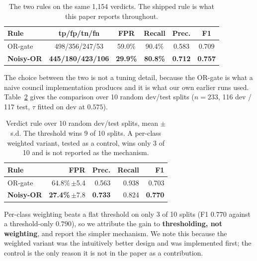 \documentclass[sigconf,nonacm]{acmart}
\begin{document}
\begin{table}[t]
\centering
\caption{The two rules on the same 1,154 verdicts. The shipped rule is what this
paper reports throughout.}
\label{tab:rule}
\small
\begin{tabular}{@{}lccccc@{}}
\toprule
\textbf{Rule} & \textbf{tp/fp/tn/fn} & \textbf{FPR} & \textbf{Recall} &
\textbf{Prec.} & \textbf{F1} \\
\midrule
OR-gate & 498/356/247/53 & 59.0\% & 90.4\% & 0.583 & 0.709 \\
\textbf{Noisy-OR} & \textbf{445/180/423/106} & \textbf{29.9\%} &
\textbf{80.8\%} & \textbf{0.712} & \textbf{0.757} \\
\bottomrule
\end{tabular}
\end{table}

The choice between the two is not a tuning detail, because the OR-gate is what a
naive council implementation produces and it is what our own earlier runs used.
Table~\ref{tab:splits} gives the comparison over 10 random dev/test splits
($n = 233$, 116 dev / 117 test, $\tau$ fitted on dev at $0.575$).

\begin{table}[t]
\centering
\caption{Verdict rule over 10 random dev/test splits, mean $\pm$ s.d. The
threshold wins 9 of 10 splits. A per-class weighted variant, tested as a control,
wins only 3 of 10 and is not reported as the mechanism.}
\label{tab:splits}
\small
\begin{tabular}{@{}lrrrr@{}}
\toprule
\textbf{Rule} & \textbf{FPR} & \textbf{Prec.} & \textbf{Recall} & \textbf{F1} \\
\midrule
OR-gate & 64.8\%\,$\pm$5.4 & 0.563 & 0.938 & 0.703 \\
\textbf{Noisy-OR} & \textbf{27.4\%}\,$\pm$7.8 & \textbf{0.733} & 0.824 &
\textbf{0.770} \\
\bottomrule
\end{tabular}
\end{table}

Per-class weighting beats a flat threshold on only 3 of 10 splits
(F1 $0.770$ against a threshold-only $0.790$), so we attribute the gain to
\textbf{thresholding, not weighting}, and report the simpler mechanism. We note
this because the weighted variant was the intuitively better design and was
implemented first; the control is the only reason it is not in the paper as a
contribution.
\end{document}
